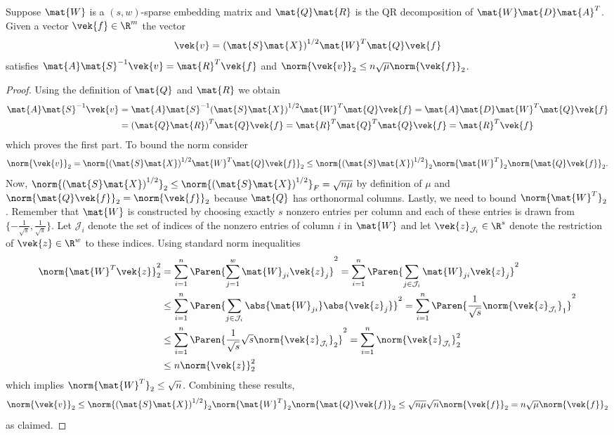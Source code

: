 \begin{lemma}\label{thm:perturbation-vector}
Suppose \(\mat{W}\) is a \((s, w)\)-sparse embedding matrix and \(\mat{Q}\mat{R}\) is the QR decomposition of \(\mat{W}\mat{D}\mat{A}^T\).
Given a vector \(\vek{f} \in \R^m\) the vector
\[ \vek{v} = {(\mat{S}\mat{X})}^{1/2} \mat{W}^T \mat{Q} \vek{f} \]
satisfies \( \mat{A}\mat{S}^{-1}\vek{v} = \mat{R}^T \vek{f} \) and \(\norm{\vek{v}}_2 \leq n \sqrt{\mu} \norm{\vek{f}}_2\).
\end{lemma}
\begin{proof}
Using the definition of \(\mat{Q}\) and \(\mat{R}\) we obtain
\begin{align*}
  \mat{A} \mat{S}^{-1} \vek{v}
  &= \mat{A} \mat{S}^{-1} {(\mat{S}\mat{X})}^{1/2} \mat{W}^T \mat{Q} \vek{f}
   = \mat{A} \mat{D} \mat{W}^T \mat{Q} \vek{f} \\
  &= {(\mat{Q} \mat{R})}^T \mat{Q} \vek{f}
   = \mat{R}^T \mat{Q}^T \mat{Q} \vek{f}
   = \mat{R}^T \vek{f}
\end{align*}
which proves the first part.
To bound the norm consider
\[ 
  \norm{\vek{v}}_2
  = \norm{{(\mat{S}\mat{X})}^{1/2} \mat{W}^T \mat{Q} \vek{f}}_2
  \leq \norm{{(\mat{S}\mat{X})}^{1/2}}_2 \norm{\mat{W}^T}_2 \norm{\mat{Q} \vek{f}}_2.
\]
Now, \(\norm{{(\mat{S}\mat{X})}^{1/2}}_2 \leq \norm{{(\mat{S}\mat{X})}^{1/2}}_F = \sqrt{n \mu}\) by definition of \(\mu\) and \(\norm{\mat{Q}\vek{f}}_2 = \norm{\vek{f}}_2\) because \(\mat{Q}\) has orthonormal columns.
Lastly, we need to bound \(\norm{\mat{W}^T}_2\).
Remember that \(\mat{W}\) is constructed by choosing exactly \(s\) nonzero entries per column and each of these entries is drawn from \(\{-\frac{1}{\sqrt{s}}, \frac{1}{\sqrt{s}}\}\).
Let \(\mathcal{J}_i\) denote the set of indices of the nonzero entries of column \(i\) in \(\mat{W}\) and let \(\vek{z}_{\mathcal{J}_i} \in \R^s\) denote the restriction of \(\vek{z} \in \R^w\) to these indices.
Using standard norm inequalities
\begin{align*}
  \norm{\mat{W}^T \vek{z}}_2^2 &= \sum_{i=1}^{n} \Paren{ \sum_{j=1}^{w} \mat{W}_{ji} \vek{z}_j }^2 = \sum_{i=1}^{n} \Paren{ \sum_{j \in \mathcal{J}_i} \mat{W}_{ji} \vek{z}_j }^2 \\
  &\leq \sum_{i=1}^{n} \Paren{ \sum_{j \in \mathcal{J}_i} \abs{\mat{W}_{ji}} \abs{\vek{z}_j} }^2 = \sum_{i=1}^{n} \Paren{ \frac{1}{\sqrt{s}} \norm{\vek{z}_{\mathcal{J}_i}}_1 }^2 \\
  &\leq \sum_{i=1}^{n} \Paren{ \frac{1}{\sqrt{s}} \sqrt{s} \norm{\vek{z}_{\mathcal{J}_i}}_2 }^2 = \sum_{i=1}^{n} \norm{\vek{z}_{\mathcal{J}_i}}_2^2 \\
  &\leq n \norm{\vek{z}}_2^2
\end{align*}
which implies \(\norm{\mat{W}^T}_2 \leq \sqrt{n}\).
Combining these results,
\[ 
  \norm{\vek{v}}_2
  \leq \norm{{(\mat{S}\mat{X})}^{1/2}}_2 \norm{\mat{W}^T}_2 \norm{\mat{Q} \vek{f}}_2
  \leq \sqrt{n \mu} \sqrt{n} \norm{\vek{f}}_2 = n \sqrt{\mu} \norm{\vek{f}}_2
\]
as claimed.
\end{proof}

